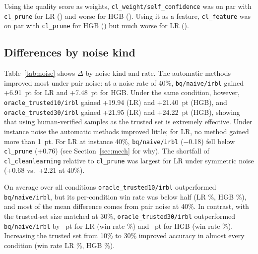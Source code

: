 \documentclass[a4paper,10pt]{article}
\newcommand{\method}[1]{\texttt{#1}}
\begin{document}
Using the quality score as weights, \method{cl\_weight/self\_confidence} was on par with \method{cl\_prune} for LR (\PLRWeightVsPrune) and worse for HGB (\PHGBWeightVsPrune).
Using it as a feature, \method{cl\_feature} was on par with \method{cl\_prune} for HGB (\PHGBFeatureVsPrune) but much worse for LR (\PLRFeatureVsPrune).

\begin{table}[tbp]
  \centering
  \caption{Accuracy differences (pt) between method A and method B under identical conditions. A win is the percentage of conditions in which A outperformed B. Differences are computed from unrounded accuracies, so they may differ by 0.01~pt from the differences of the rounded values in Table~\ref{tab:overall}.}
  \label{tab:paired}
  \footnotesize
  \setlength{\tabcolsep}{4pt}
  
\end{table}

\subsection{Differences by noise kind}
Table~\ref{tab:noise} shows $\Delta$ by noise kind and rate.
The automatic methods improved most under pair noise: at a noise rate of 40\%, \method{bq/naive/irbl} gained +6.91~pt for LR and +7.48~pt for HGB.
Under the same condition, however, \method{oracle\_trusted10/irbl} gained +19.94 (LR) and +21.40~pt (HGB), and \method{oracle\_trusted30/irbl} gained +21.95 (LR) and +24.22~pt (HGB), showing that using human-verified samples as the trusted set is extremely effective.
Under instance noise the automatic methods improved little; for LR, no method gained more than 1~pt.
For LR at instance 40\%, \method{bq/naive/irbl} ($-$0.18) fell below \method{cl\_prune} (+0.76) (see Section~\ref{sec:mech} for why).
The shortfall of \method{cl\_cleanlearning} relative to \method{cl\_prune} was largest for LR under symmetric noise (+0.68 vs.\ +2.21 at 40\%).

On average over all conditions \method{oracle\_trusted10/irbl} outperformed \method{bq/naive/irbl}, but its per-condition win rate was below half (LR \PLROracleTenVsNaiveIrblWin\%, HGB \PHGBOracleTenVsNaiveIrblWin\%), and most of the mean difference comes from pair noise at 40\%.
In contrast, with the trusted-set size matched at 30\%, \method{oracle\_trusted30/irbl} outperformed \method{bq/naive/irbl} by \PLROracleThirtyVsNaiveIrbl{}~pt for LR (win rate \PLROracleThirtyVsNaiveIrblWin\%) and \PHGBOracleThirtyVsNaiveIrbl{}~pt for HGB (win rate \PHGBOracleThirtyVsNaiveIrblWin\%).
Increasing the trusted set from 10\% to 30\% improved accuracy in almost every condition (win rate LR \PLROracleThirtyVsOracleTenWin\%, HGB \PHGBOracleThirtyVsOracleTenWin\%).
\end{document}
